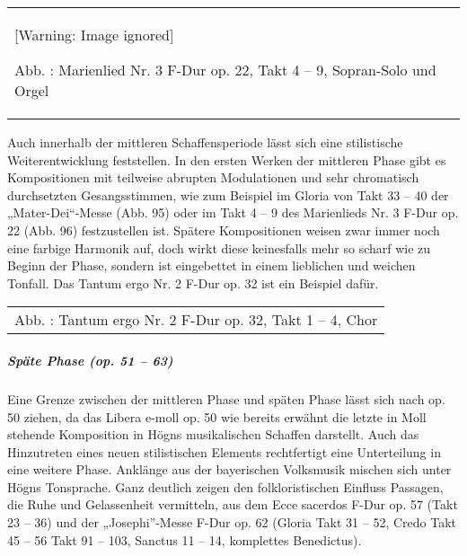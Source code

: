 \documentclass[a4paper]{article}
\newcounter{Abb}
\renewcommand\theAbb{\arabic{Abb}}
\begin{document}
\begin{center}
\tablefirsthead{}
\tablehead{}
\tabletail{}
\tablelasttail{}
\begin{supertabular}{m{11.78cm}}
  [Warning: Image ignored] %
 
\label{bkm:Ref99946259}Abb. \stepcounter{Abb}{\theAbb}: Marienlied Nr. 3
F-Dur op. 22, Takt 4 – 9, Sopran-Solo und Orgel\\
\end{supertabular}
\end{center}
Auch innerhalb der mittleren Schaffensperiode lässt sich eine
stilistische Weiterentwicklung feststellen. In den ersten Werken der
mittleren Phase gibt es Kompositionen mit teilweise abrupten
Modulationen und sehr chromatisch durchsetzten Gesangsstimmen, wie zum
Beispiel im Gloria von Takt 33 – 40 der „Mater-Dei“-Messe (Abb. 95)
oder im Takt 4 – 9 des Marienlieds Nr. 3 F-Dur op. 22 (Abb. 96)
festzustellen ist. Spätere Kompositionen weisen zwar immer noch eine
farbige Harmonik auf, doch wirkt diese keinesfalls mehr so scharf wie
zu Beginn der Phase, sondern ist eingebettet in einem lieblichen und
weichen Tonfall. Das Tantum ergo Nr. 2 F-Dur op. 32 ist ein Beispiel
dafür.

\begin{center}
\tablefirsthead{}
\tablehead{}
\tabletail{}
\tablelasttail{}
\begin{supertabular}{m{8.399cm}}
{%
 \par}
Abb. \stepcounter{Abb}{\theAbb}: Tantum ergo Nr. 2 F-Dur op. 32, Takt 1
– 4, Chor\\
\end{supertabular}
\end{center}
\subparagraph[Späte Phase (op. 51 – 63)]{Späte Phase (op. 51 – 63)}
Eine Grenze zwischen der mittleren Phase und späten Phase lässt sich
nach op. 50 ziehen, da das Libera e-moll op. 50 wie bereits erwähnt die
letzte in Moll stehende Komposition in Högns musikalischen Schaffen
darstellt. Auch das Hinzutreten eines neuen stilistischen Elements
rechtfertigt eine Unterteilung in eine weitere Phase. Anklänge aus der
bayerischen Volksmusik mischen sich unter Högns Tonsprache. Ganz
deutlich zeigen den folkloristischen Einfluss Passagen, die Ruhe und
Gelassenheit vermitteln, aus dem Ecce sacerdos F-Dur op. 57 (Takt 23 –
36) und der „Josephi”-Messe F-Dur op. 62 (Gloria Takt 31 – 52, Credo
Takt 45 – 56 Takt 91 – 103, Sanctus 11 – 14, komplettes Benedictus).
\end{document}
